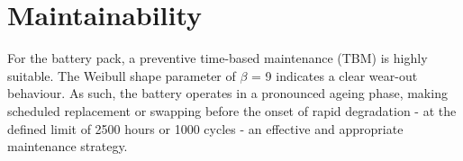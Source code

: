 \section{Maintainability}
\label{sec:maintainability}

For the battery pack, a preventive time-based maintenance (TBM) is highly suitable. The Weibull shape parameter of $\beta$ = 9 indicates a clear wear-out behaviour. As such, the battery operates in a pronounced ageing phase, making scheduled replacement or swapping before the onset of rapid degradation - at the defined limit of 2500 hours or 1000 cycles - an effective and appropriate maintenance strategy.

